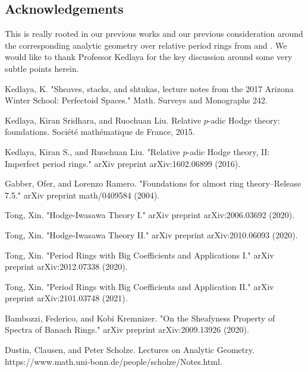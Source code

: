 \documentclass[12pt]{amsart}
\theoremstyle{definition}
\numberwithin{equation}{section}
\begin{document}
\newpage

\subsection*{Acknowledgements} 

This is really rooted in our previous works and our previous consideration around the corresponding analytic geometry over relative period rings from \cite{KL1} and \cite{KL2}. We would like to thank Professor Kedlaya for the key discussion around some very subtle points herein.






\newpage


\begin{thebibliography}{10}
 Kedlaya, K. "Sheaves, stacks, and shtukas, lecture notes from the 2017 Arizona Winter School: Perfectoid Spaces." Math. Surveys and Monographs 242.

 Kedlaya, Kiran Sridhara, and Ruochuan Liu. Relative $p$-adic Hodge theory: foundations. Soci\'et\'e math\'ematique de France, 2015.

 Kedlaya, Kiran S., and Ruochuan Liu. "Relative $p$-adic Hodge theory, II: Imperfect period rings." arXiv preprint arXiv:1602.06899 (2016).

 Gabber, Ofer, and Lorenzo Ramero. "Foundations for almost ring theory--Release 7.5." arXiv preprint math/0409584 (2004).

 Tong, Xin. "Hodge-Iwasawa Theory I." arXiv preprint arXiv:2006.03692 (2020).

 Tong, Xin. "Hodge-Iwasawa Theory II." arXiv preprint arXiv:2010.06093 (2020).

 Tong, Xin. "Period Rings with Big Coefficients and Applications I." arXiv preprint arXiv:2012.07338 (2020).

 Tong, Xin. "Period Rings with Big Coefficients and Application II." arXiv preprint arXiv:2101.03748 (2021).




  Bambozzi, Federico, and Kobi Kremnizer. "On the Sheafyness Property of Spectra of Banach Rings." arXiv preprint arXiv:2009.13926 (2020).

 Dustin, Clausen, and Peter Scholze. Lectures on Analytic Geometry. https://www.math.uni-bonn.de/people/scholze/Notes.html. 



\end{thebibliography}
\end{document}
